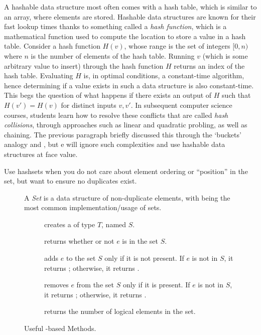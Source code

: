 A hashable data structure most often comes with a hash table, which is similar to an array, where elements are stored. Hashable data structures are known for their fast lookup times thanks to something called a \emph{hash function}, which is a mathematical function used to compute the location to store a value in a hash table. Consider a hash function $H(v)$, whose range is the set of integers $[0, n)$ where $n$ is the number of elements of the hash table. Running $v$ (which is some arbitrary value to insert) through the hash function $H$ returns an index of the hash table. Evaluating $H$ is, in optimal conditions, a constant-time algorithm, hence determining if a value exists in such a data structure is also constant-time. This begs the question of what happens if there exists an output of $H$ such that $H(v') = H(v)$ for distinct inputs $v, v'$. In subsequent computer science courses, students learn how to resolve these conflicts that are called \emph{hash collisions}, through approaches such as linear and quadratic probling, as well as chaining. The previous paragraph briefly discussed this through the `buckets' analogy and , but e will ignore such complexities and use hashable data structures at face value.  

Use hashsets when you do not care about element ordering or ``position'' in the set, but want to ensure no duplicates exist.
\begin{figure}[tp]
  \small
  \begin{tcolorbox}[title=Java Sets]
    A \emph{Set} is a data structure of non-duplicate elements, with  being the most common implementation/usage of sets.
    \vspace{2ex}
  \begin{description}
    \item [] creates a  of type $T$, named $S$.
     \item [] returns whether or not $e$ is in the set $S$.
     \item [] adds $e$ to the set $S$ only if it is not present. If $e$ is not in $S$, it returns ; otherwise, it returns .
     \item [] removes $e$ from the set $S$ only if it is present. If $e$ is not in $S$, it returns ; otherwise, it returns .
    \item [] returns the number of logical elements in the set.
  \end{description}
\end{tcolorbox}
  \caption{Useful -based Methods.}
  \label{fig:hashsets}
\end{figure}

